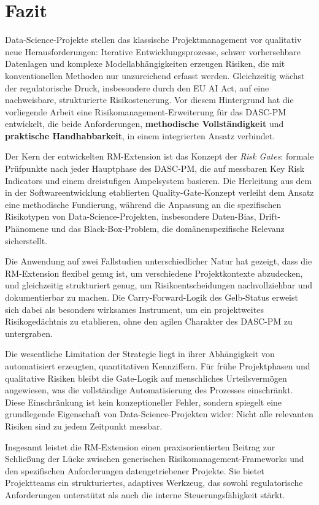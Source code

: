 \chapter{Fazit}

Data-Science-Projekte stellen das klassische Projektmanagement vor qualitativ 
neue Herausforderungen: Iterative Entwicklungsprozesse, schwer vorhersehbare 
Datenlagen und komplexe Modellabhängigkeiten erzeugen Risiken, die mit 
konventionellen Methoden nur unzureichend erfasst werden. Gleichzeitig wächst 
der regulatorische Druck, insbesondere durch den EU AI Act, auf eine nachweisbare, 
strukturierte Risikosteuerung. Vor diesem Hintergrund hat die vorliegende Arbeit 
eine Risikomanagement-Erweiterung für das DASC-PM entwickelt, die beide 
Anforderungen, \textbf{methodische Vollständigkeit} und \textbf{praktische Handhabbarkeit},  
in einem integrierten Ansatz verbindet.

Der Kern der entwickelten RM-Extension ist das Konzept der \textit{Risk Gates}: 
formale Prüfpunkte nach jeder Hauptphase des DASC-PM, die auf messbaren Key Risk 
Indicators und einem dreistufigen Ampelsystem basieren. Die Herleitung aus dem 
in der Softwareentwicklung etablierten Quality-Gate-Konzept verleiht dem Ansatz 
eine methodische Fundierung, während die Anpassung an die spezifischen Risikotypen 
von Data-Science-Projekten, insbesondere Daten-Bias, Drift-Phänomene und das 
Black-Box-Problem, die domänenspezifische Relevanz sicherstellt.

Die Anwendung auf zwei Fallstudien unterschiedlicher Natur hat gezeigt, dass 
die RM-Extension flexibel genug ist, um verschiedene Projektkontexte abzudecken, 
und gleichzeitig strukturiert genug, um Risikoentscheidungen nachvollziehbar und
dokumentierbar zu machen. Die Carry-Forward-Logik des Gelb-Status erweist sich 
dabei als besonders wirksames Instrument, um ein projektweites Risikogedächtnis 
zu etablieren, ohne den agilen Charakter des DASC-PM zu untergraben.

Die wesentliche Limitation der Strategie liegt in ihrer Abhängigkeit von 
automatisiert erzeugten, quantitativen Kennziffern. Für frühe Projektphasen 
und qualitative Risiken bleibt die Gate-Logik auf menschliches Urteilsvermögen 
angewiesen, was die vollständige Automatisierung des Prozesses einschränkt. 
Diese Einschränkung ist kein konzeptioneller Fehler, sondern spiegelt eine 
grundlegende Eigenschaft von Data-Science-Projekten wider: Nicht alle relevanten 
Risiken sind zu jedem Zeitpunkt messbar.

Insgesamt leistet die RM-Extension einen praxisorientierten Beitrag zur 
Schließung der Lücke zwischen generischen Risikomanagement-Frameworks und 
den spezifischen Anforderungen datengetriebener Projekte. Sie bietet 
Projektteams ein strukturiertes, adaptives Werkzeug, das sowohl regulatorische 
Anforderungen unterstützt als auch die interne Steuerungsfähigkeit stärkt.